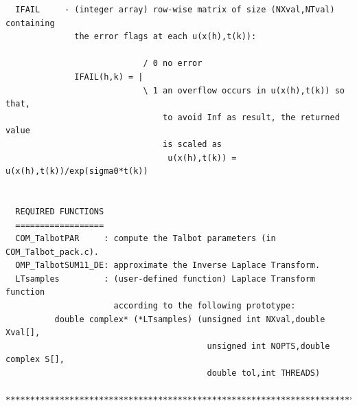 \documentclass[a4paper,10pt]{report}%
\begin{document}
\begin{lstlisting}
  IFAIL     - (integer array) row-wise matrix of size (NXval,NTval) containing
              the error flags at each u(x(h),t(k)):

                            / 0 no error
              IFAIL(h,k) = |
                            \ 1 an overflow occurs in u(x(h),t(k)) so that,
                                to avoid Inf as result, the returned value
                                is scaled as
                                 u(x(h),t(k)) = u(x(h),t(k))/exp(sigma0*t(k))


  REQUIRED FUNCTIONS
  ==================
  COM_TalbotPAR     : compute the Talbot parameters (in COM_Talbot_pack.c).
  OMP_TalbotSUM11_DE: approximate the Inverse Laplace Transform.
  LTsamples         : (user-defined function) Laplace Transform function
                      according to the following prototype:
          double complex* (*LTsamples) (unsigned int NXval,double Xval[],
                                         unsigned int NOPTS,double complex S[],
                                         double tol,int THREADS)

*****************************************************************************\
\end{lstlisting}
\end{document}
